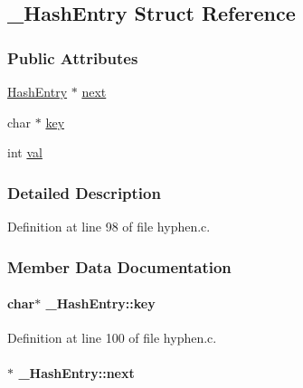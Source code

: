 \hypertarget{struct___hash_entry}{\subsection{\-\_\-\-Hash\-Entry \-Struct \-Reference}
\label{struct___hash_entry}
}
\subsubsection*{\-Public \-Attributes}
\begin{DoxyCompactItemize}
\item 
\hyperlink{hyphen_8c_a5ee9ebda39a0bc28128d176a5018151c}{\-Hash\-Entry} $\ast$ \hyperlink{struct___hash_entry_acd1ec10363520d8cf32205e03e3e3493}{next}
\item 
char $\ast$ \hyperlink{struct___hash_entry_a00e4de3cd14f3263e8505e2e3e77c605}{key}
\item 
int \hyperlink{struct___hash_entry_a1acd8c25274e1385e1d0624f398e2a06}{val}
\end{DoxyCompactItemize}


\subsubsection{\-Detailed \-Description}


\-Definition at line 98 of file hyphen.\-c.



\subsubsection{\-Member \-Data \-Documentation}
\hypertarget{struct___hash_entry_a00e4de3cd14f3263e8505e2e3e77c605}{
\paragraph[{key}]{\setlength{\rightskip}{0pt plus 5cm}char$\ast$ {\bf \-\_\-\-Hash\-Entry\-::key}}}\label{struct___hash_entry_a00e4de3cd14f3263e8505e2e3e77c605}


\-Definition at line 100 of file hyphen.\-c.

\hypertarget{struct___hash_entry_acd1ec10363520d8cf32205e03e3e3493}{
\paragraph[{next}]{$\ast$ {\bf \-\_\-\-Hash\-Entry\-::next}}}\label{struct___hash_entry_acd1ec10363520d8cf32205e03e3e3493}


